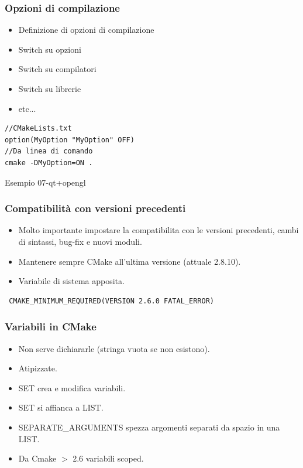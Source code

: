 \documentclass[10pt] {beamer}
\begin{document}

\begin{frame}[fragile]
\frametitle{Opzioni di compilazione}
\begin{itemize}
 \item Definizione di opzioni di compilazione
 \item Switch su opzioni
 \item Switch su compilatori
 \item Switch su librerie
 \item etc...
\end{itemize}

\begin{verbatim}
//CMakeLists.txt
option(MyOption "MyOption" OFF)
//Da linea di comando
cmake -DMyOption=ON .
\end{verbatim}

Esempio 07-qt+opengl
\end{frame}



\begin{frame}[fragile]
\frametitle{Compatibilità con versioni precedenti}
\begin{itemize}
\item Molto importante impostare la compatibilita con le versioni precedenti, cambi di sintassi, bug-fix e nuovi moduli.
\item Mantenere sempre CMake all'ultima versione (attuale 2.8.10).
\item Variabile di sistema apposita.
\end{itemize}
\begin{verbatim}
 CMAKE_MINIMUM_REQUIRED(VERSION 2.6.0 FATAL_ERROR)
\end{verbatim}
\end{frame}


\begin{frame}
	\frametitle{Variabili in CMake}
	\begin{itemize}
		\item Non serve dichiararle (stringa vuota se non esistono).
		\item Atipizzate.
		\item SET crea e modifica variabili.
		\item SET si affianca a LIST.
		\item SEPARATE\_ARGUMENTS spezza argomenti separati da spazio in una LIST.
		\item Da Cmake $>$ 2.6 variabili scoped.
\end{itemize}
\end{frame}
\end{document}
